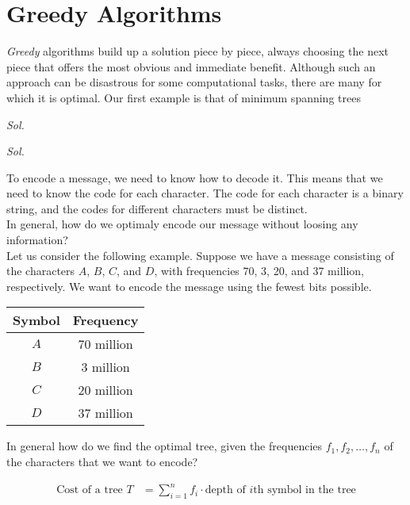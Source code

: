 \chapter{Greedy Algorithms}

\emph{Greedy} algorithms build up a solution piece by piece, always choosing the next piece that offers the most obvious and immediate benefit. Although such an approach can be disastrous for some computational tasks, there are many for which it is optimal. Our first example is that of minimum spanning trees


\textit{ Sol. }


\textit{ Sol. }

To encode a message, we need to know how to decode it. This means that we need to know the code for each character. The code for each character is a binary string, and the codes for different characters must be distinct. \\

In general, how do we optimaly encode our message without loosing any information? \\

Let us consider the following example. Suppose we have a message consisting of the characters $A$, $B$, $C$, and $D$, with frequencies 70, 3, 20, and 37 million, respectively. We want to encode the message using the fewest bits possible.

\begin{center}
	\begin{tabular}{|c|c|}
		\hline
		\textbf{Symbol} & \textbf{Frequency} \\
		\hline
		$A$             & 70 million         \\
		\hline
		$B$             & 3 million          \\
		\hline
		$C$             & 20 million         \\
		\hline
		$D$             & 37 million         \\
		\hline
	\end{tabular}
\end{center}

In general how do we find the optimal tree, given the frequencies $f_1, f_2, \ldots, f_n$ of the characters that we want to encode?

\begin{align*}
	\text{Cost of a tree } T & = \sum_{i=1}^{n} f_i \cdot \text{depth of }i \text{th symbol in the tree} \\
\end{align*}


